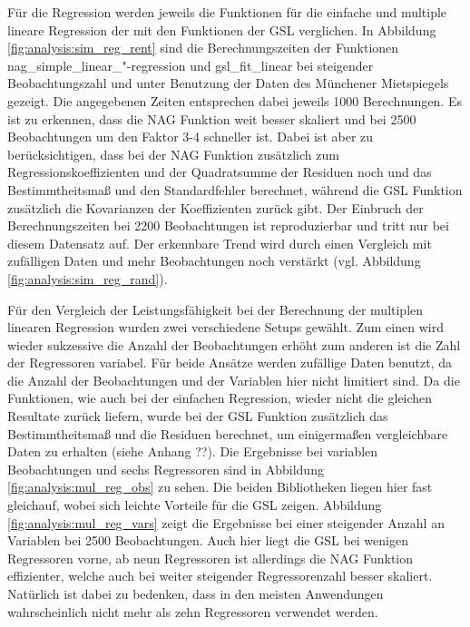 
Für die Regression werden jeweils die Funktionen für die einfache und multiple lineare Regression der \naglib mit den Funktionen der GSL verglichen.
In Abbildung \ref{fig:analysis:sim_reg_rent} sind die Berechnungszeiten der Funktionen nag\_simple\_linear\_"-regression und gsl\_fit\_linear bei steigender Beobachtungszahl und unter Benutzung der Daten des Münchener Mietspiegels gezeigt.
Die angegebenen Zeiten entsprechen dabei jeweils 1000 Berechnungen.
Es ist zu erkennen, dass die NAG Funktion weit besser skaliert und bei 2500 Beobachtungen um den Faktor 3-4 schneller ist.
Dabei ist aber zu berücksichtigen, dass bei der NAG Funktion zusätzlich zum Regressionskoeffizienten und der Quadratsumme der Residuen noch und das Bestimmtheitsmaß und den Standardfehler berechnet, während die GSL Funktion zusätzlich die Kovarianzen der Koeffizienten zurück gibt.
Der Einbruch der Berechnungszeiten bei 2200 Beobachtungen ist reproduzierbar und tritt nur bei diesem Datensatz auf.
Der erkennbare Trend wird durch einen Vergleich mit zufälligen Daten und mehr Beobachtungen noch verstärkt (vgl. Abbildung \ref{fig:analysis:sim_reg_rand}).

Für den Vergleich der Leistungsfähigkeit bei der Berechnung der multiplen linearen Regression wurden zwei verschiedene Setups gewählt.
Zum einen wird wieder sukzessive die Anzahl der Beobachtungen erhöht zum anderen ist die Zahl der Regressoren variabel. 
Für beide Ansätze werden zufällige Daten benutzt, da die Anzahl der Beobachtungen und der Variablen hier nicht limitiert sind.
Da die Funktionen, wie auch bei der einfachen Regression, wieder nicht die gleichen Resultate zurück liefern, wurde bei der GSL Funktion zusätzlich das Bestimmtheitsmaß und die Residuen berechnet, um einigermaßen vergleichbare Daten zu erhalten (siehe Anhang ??).
Die Ergebnisse bei variablen Beobachtungen und sechs Regressoren sind in Abbildung \ref{fig:analysis:mul_reg_obs} zu sehen.
Die beiden Bibliotheken liegen hier fast gleichauf, wobei sich leichte Vorteile für die GSL zeigen.
Abbildung \ref{fig:analysis:mul_reg_vars} zeigt die Ergebnisse bei einer steigender Anzahl an Variablen bei 2500 Beobachtungen.
Auch hier liegt die GSL bei wenigen Regressoren vorne, ab neun Regressoren ist allerdings die NAG Funktion effizienter, welche auch bei weiter steigender Regressorenzahl besser skaliert.
Natürlich ist dabei zu bedenken, dass in den meisten Anwendungen wahrscheinlich nicht mehr als zehn Regressoren verwendet werden.

